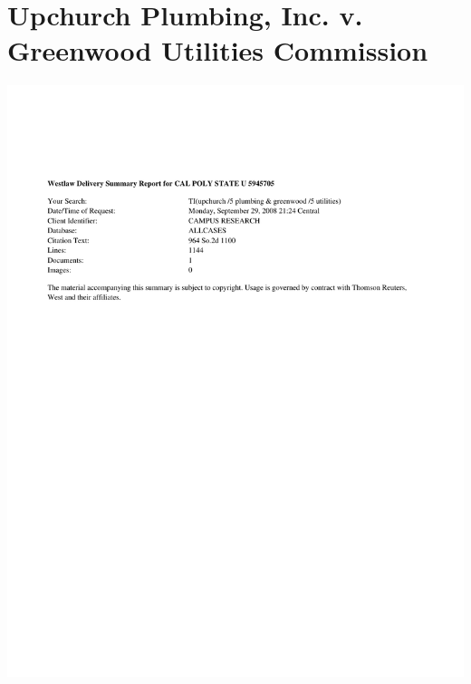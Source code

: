 \chapter{Upchurch Plumbing, Inc. v. Greenwood Utilities Commission}

\begin{center}\includegraphics{upchurch/upchurch0.pdf}\end{center}
